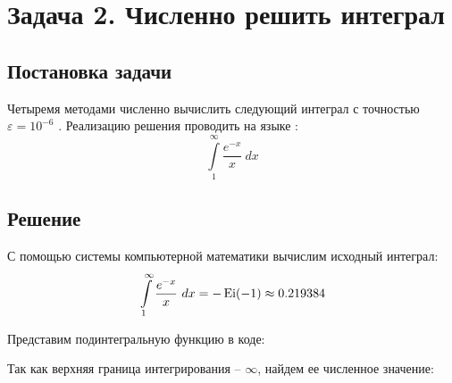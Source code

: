 \def \task {
	\int\limits_1^{\infty} {\frac{ e^{-x} }{ x } ~ dx}
}

\newcommand{\accuracy}{
	$\varepsilon = 10^{-6} $
}

\section{Задача 2. Численно решить интеграл}
	\subsection{Постановка задачи}
		Четыремя методами численно вычислить следующий интеграл с 
		точностью \accuracy. 
		Реализацию решения проводить на языке \Csh:
			\[ \task \]

	\subsection{Решение}
	
		С помощью системы компьютерной математики \wolfram вычислим исходный интеграл:
		\[ \task = -\Ei{-1} \approx 0.219384 \]
		
		Представим подинтегральную функцию в коде:
		
		
		
		Так как верхняя граница интегрирования -- $ \infty $, найдем ее
		численное значение:
		
		
		
		\begin{enumerate}
			
			
			
			\newpage
			
		\end{enumerate}

